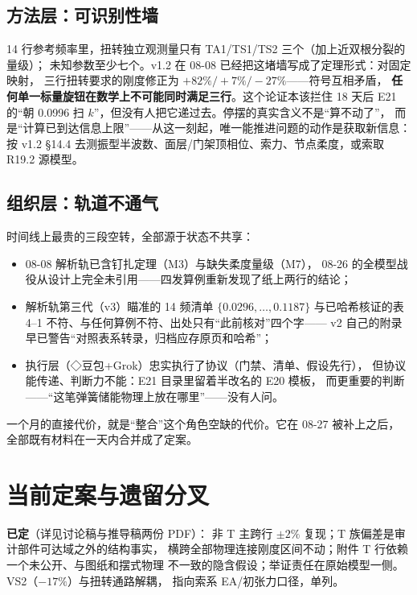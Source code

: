 \documentclass[11pt,a4paper]{ctexart}
\begin{document}
\subsection{方法层：可识别性墙}

14 行参考频率里，扭转独立观测量只有 TA1/TS1/TS2 三个（加上近双根分裂的量级）；
未知参数至少七个。v1.2 在 08-08 已经把这堵墙写成了定理形式：对固定映射，
三行扭转要求的刚度修正为 $+82\%/+7\%/-27\%$——符号互相矛盾，
\textbf{任何单一标量旋钮在数学上不可能同时满足三行}。这个论证本该拦住 18 天后
E21 的``朝 0.0996 扫 $k$''，但没有人把它递过去。停摆的真实含义不是``算不动了''，
而是``计算已到达信息上限''——从这一刻起，唯一能推进问题的动作是获取新信息：
按 v1.2 §14.4 去测振型半波数、面层/门架顶相位、索力、节点柔度，或索取 R19.2 源模型。

\subsection{组织层：轨道不通气}

时间线上最贵的三段空转，全部源于状态不共享：

\begin{itemize}
  \item 08-08 解析轨已含钉扎定理（M3）与缺失柔度量级（M7），
        08-26 的全模型战役从设计上完全未引用——四发算例重新发现了纸上两行的结论；
  \item 解析轨第三代（v3）瞄准的 14 频清单 $\{0.0296,\ldots,0.1187\}$
        与已哈希核证的表 4--1 不符、与任何算例不符、出处只有``此前核对''四个字——
        v2 自己的附录早已警告``对照表系转录，归档应存原页和哈希''；
  \item 执行层（◇豆包+Grok）忠实执行了协议（门禁、清单、假设先行），
        但协议能传递、判断力不能：E21 目录里留着半改名的 E20 模板，
        而更重要的判断——``这笔弹簧储能物理上放在哪里''——没有人问。
\end{itemize}

一个月的直接代价，就是``整合''这个角色空缺的代价。它在 08-27 被补上之后，
全部既有材料在一天内合并成了定案。

\section{当前定案与遗留分叉}

\textbf{已定}（详见讨论稿与推导稿两份 PDF）：
非 T 主跨行 $\pm2\%$ 复现；T 族偏差是审计部件可达域之外的结构事实，
横跨全部物理连接刚度区间不动；附件 T 行依赖一个未公开、与图纸和摆式物理
不一致的隐含假设；举证责任在原始模型一侧。VS2（$-17\%$）与扭转通路解耦，
指向索系 EA/初张力口径，单列。
\end{document}
